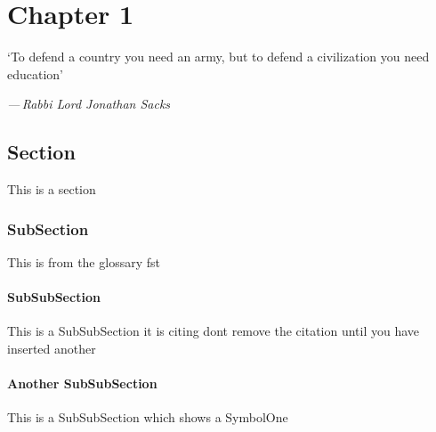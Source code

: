 \documentclass[class=report,11pt,crop=false]{standalone}
\begin{document}
\ifstandalone
    \tableofcontents
    \printnoidxglossary[type=Abbreviations,nonumberlist,title={Abbreviations}] %
    \printnoidxglossary[type=Symbols,nonumberlist,title={List of Symbols}] %
\fi


\chapter{Chapter 1\label{ch:chapter1}}

\epigraph{`To defend a country you need an army, but to defend a civilization you need education'}%
{\emph{---\,Rabbi Lord Jonathan Sacks}}
\vspace{0.5cm}

\section{Section}

This is a section

\subsection{SubSection}

This is from the glossary \gls{fst}

\subsubsection{SubSubSection}

This is a SubSubSection it is citing dont remove the citation until you have inserted
another \cite{levanon2004radar}

\subsubsection{Another SubSubSection}

This is a SubSubSection which shows a \gls{SymbolOne}


\ifstandalone
    \printbibliography  %
\fi
\end{document}
